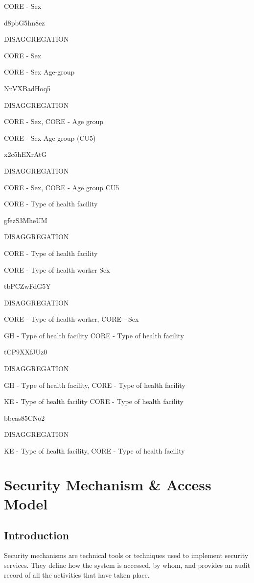 \documentclass[]{book}
\begin{document}
CORE - Sex

d8pbG5hn8ez

DISAGGREGATION

CORE - Sex

CORE - Sex \textbar{} Age-group

NnVXBadHoq5

DISAGGREGATION

CORE - Sex, CORE - Age group

CORE - Sex \textbar{} Age-group (CU5)

x2c5hEXrAtG

DISAGGREGATION

CORE - Sex, CORE - Age group CU5

CORE - Type of health facility

gfezS3MheUM

DISAGGREGATION

CORE - Type of health facility

CORE - Type of health worker \textbar{} Sex

tbPCZwFdG5Y

DISAGGREGATION

CORE - Type of health worker, CORE - Sex

GH - Type of health facility \textbar{} CORE - Type of health facility

tCP9XXfJUz0

DISAGGREGATION

GH - Type of health facility, CORE - Type of health facility

KE - Type of health facility \textbar{} CORE - Type of health facility

bbcas85CNo2

DISAGGREGATION

KE - Type of health facility, CORE - Type of health facility

\hypertarget{access}{%
\chapter{Security Mechanism \& Access Model}\label{access}}

\hypertarget{introduction-3}{%
\section{Introduction}\label{introduction-3}}

Security mechanisms are technical tools or techniques used to implement security services. They define how the system is accessed, by whom, and provides an audit record of all the activities that have taken place.
\end{document}
